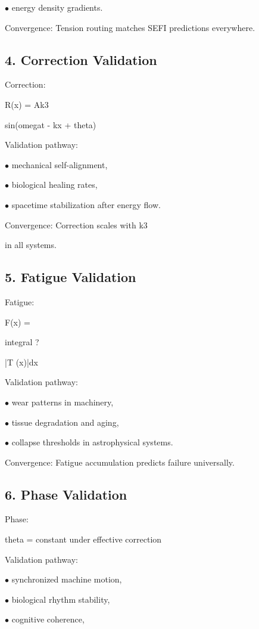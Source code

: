 \documentclass[10pt]{article}
\begin{document}
\noindent $\bullet$ energy density gradients.

Convergence: Tension routing matches SEFI predictions everywhere.

\subsection*{4. Correction Validation}
Correction:

R(x) = Ak3

sin(omegat - kx + theta)

Validation pathway:

\noindent $\bullet$ mechanical self-alignment,

\noindent $\bullet$ biological healing rates,

\noindent $\bullet$ spacetime stabilization after energy flow.

Convergence: Correction scales with k3

in all systems.

\subsection*{5. Fatigue Validation}
Fatigue:

F(x) =

integral ?

|T (x)|dx

Validation pathway:

\noindent $\bullet$ wear patterns in machinery,

\noindent $\bullet$ tissue degradation and aging,

\noindent $\bullet$ collapse thresholds in astrophysical systems.

Convergence: Fatigue accumulation predicts failure universally.


\subsection*{6. Phase Validation}
Phase:

theta = constant under effective correction

Validation pathway:

\noindent $\bullet$ synchronized machine motion,

\noindent $\bullet$ biological rhythm stability,

\noindent $\bullet$ cognitive coherence,
\end{document}
